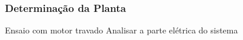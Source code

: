 \documentclass{beamer}
\begin{document}
\begin{frame}
	\frametitle{Determinação da Planta}
	\begin{block}{Ensaio com motor travado}
		Analisar a parte elétrica do sistema
		\begin{center}
		\end{center}
	\end{block}
\end{frame}
\end{document}
